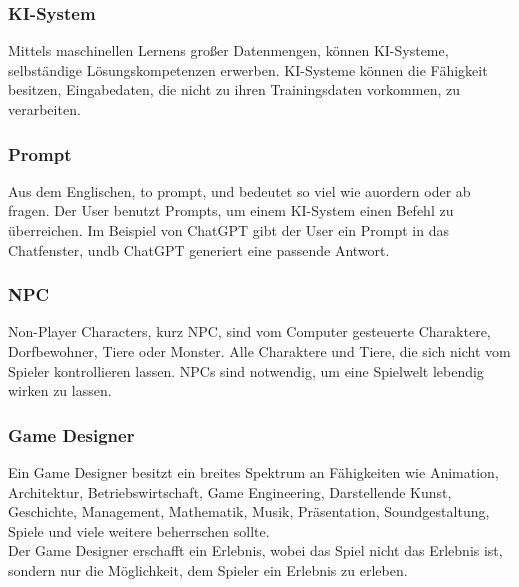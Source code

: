 \documentclass[10pt,a4paper,bibliography=totocnumbered,listof=totocnumbered]{scrartcl}
\begin{document}
\subsubsection{KI-System}
Mittels maschinellen Lernens großer Datenmengen, können KI-Systeme, selbständige Lösungskompetenzen erwerben. KI-Systeme können die Fähigkeit besitzen, Eingabedaten, die nicht zu ihren Trainingsdaten vorkommen, zu verarbeiten.
\subsubsection{Prompt}
Aus dem Englischen, to prompt, und bedeutet so viel wie auordern oder ab fragen. Der User benutzt Prompts, um einem KI-System einen Befehl zu überreichen. Im Beispiel von ChatGPT gibt der User ein Prompt in das Chatfenster, undb ChatGPT generiert eine passende Antwort.
\subsubsection{NPC}
Non-Player Characters, kurz NPC, sind vom Computer gesteuerte Charaktere, Dorfbewohner, Tiere oder Monster. Alle Charaktere und Tiere, die sich nicht vom Spieler kontrollieren lassen. NPCs sind notwendig, um eine Spielwelt lebendig wirken zu lassen.
\subsubsection{Game Designer}
Ein Game Designer besitzt ein breites Spektrum an Fähigkeiten wie Animation, Architektur, Betriebswirtschaft, Game Engineering, Darstellende Kunst, Geschichte, Management, Mathematik, Musik, Präsentation, Soundgestaltung, Spiele und viele weitere beherrschen sollte.
\\
Der Game Designer erschafft ein Erlebnis, wobei das Spiel nicht das Erlebnis ist, sondern nur die Möglichkeit, dem Spieler ein Erlebnis zu erleben.
\end{document}
